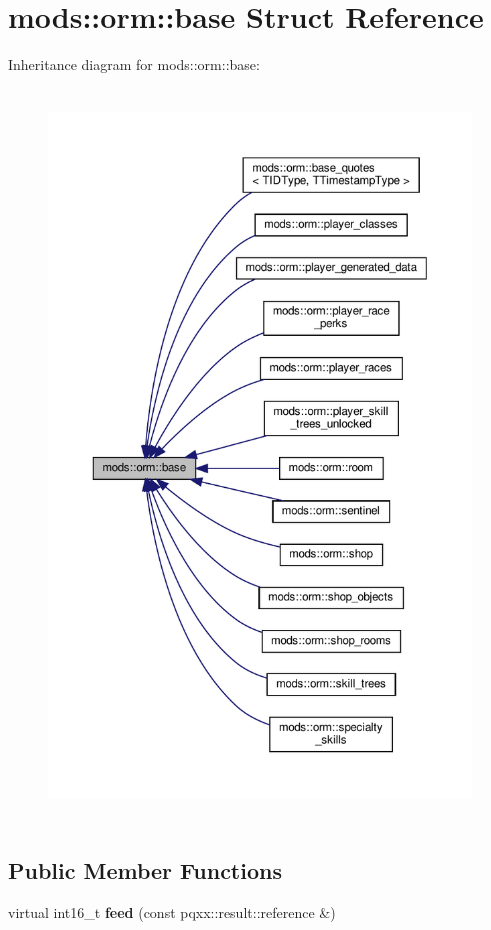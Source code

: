 \hypertarget{structmods_1_1orm_1_1base}{}\section{mods\+:\+:orm\+:\+:base Struct Reference}
\label{structmods_1_1orm_1_1base}


Inheritance diagram for mods\+:\+:orm\+:\+:base\+:
\nopagebreak
\begin{figure}[H]
\begin{center}
\leavevmode
\includegraphics[height=550pt]{structmods_1_1orm_1_1base__inherit__graph}
\end{center}
\end{figure}
\subsection*{Public Member Functions}
\begin{DoxyCompactItemize}
\item 
\mbox{\label{structmods_1_1orm_1_1base_a664fca1958049edfb203ec8993cf81bd}} 
virtual int16\+\_\+t {\bfseries feed} (const pqxx\+::result\+::reference \&)
\end{DoxyCompactItemize}
